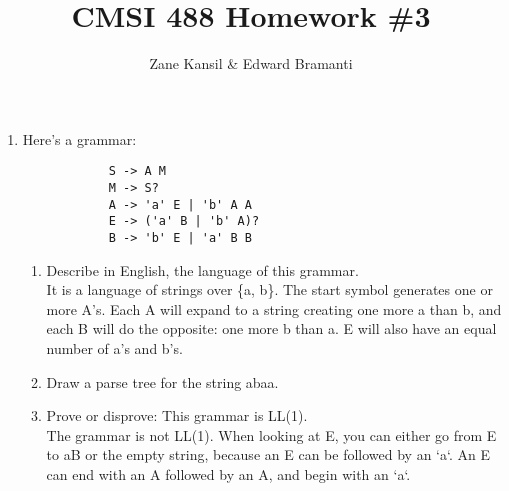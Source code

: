 \documentclass{article}
\begin{document}
\title{CMSI 488 Homework \#3}
\author{Zane Kansil \& Edward Bramanti}
\maketitle
\begin{enumerate}
    \item Here's a grammar:
        \begin{verbatim}
            S -> A M
            M -> S?
            A -> 'a' E | 'b' A A
            E -> ('a' B | 'b' A)?
            B -> 'b' E | 'a' B B
        \end{verbatim}
        \begin{enumerate}
            \item Describe in English, the language of this grammar. \\
            It is a language of strings over \{a, b\}. The start symbol generates one or more A's. Each A will expand to a string creating one more a than b, and each B will do the opposite: one more b than a. E will also have an equal number of a's and b's.
            \item Draw a parse tree for the string abaa. \\
            \item Prove or disprove: This grammar is LL(1). \\
                The grammar is not LL(1). When looking at E, you can either go from E to aB or the empty string, because an E can be followed by an `a`. An E can end with an A followed by an A, and begin with an `a`.

\end{enumerate}
\end{enumerate}
\end{document}
